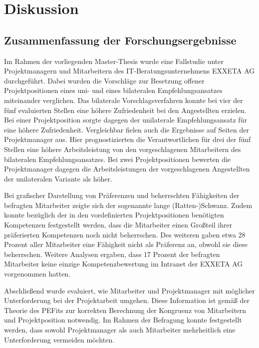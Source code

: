 \chapter{Diskussion}
\label{ch:diskussion}

\section{Zusammenfassung der Forschungsergebnisse}
\label{ch:diskussion:zusammenfassung}
Im Rahmen der vorliegenden Master-Thesis wurde eine Fallstudie unter Projektmanagern und Mitarbeitern des IT-Beratungsunternehmens EXXETA AG durchgeführt. Dabei wurden die Vorschläge zur Besetzung offener Projektpositionen eines uni- und eines bilateralen Empfehlungsansatzes miteinander verglichen. Das bilaterale Vorschlagsverfahren konnte bei vier der fünf evaluierten Stellen eine höhere Zufriedenheit bei den Angestellten erzielen. Bei einer Projektposition sorgte dagegen der unilaterale Empfehlungsansatz für eine höhere Zufriedenheit. Vergleichbar fielen auch die Ergebnisse auf Seiten der Projektmanager aus. Hier prognostizierten die Verantwortlichen für drei der fünf Stellen eine höhere Arbeitsleistung von den vorgeschlagenen Mitarbeitern des bilateralen Empfehlungsansatzes. Bei zwei Projektpositionen bewerten die Projektmanager dagegen die Arbeitsleistungen der vorgeschlagenen Angestellten der unilateralen Variante als höher.

Bei grafischer Darstellung von Präferenzen und beherrschten Fähigkeiten der befragten Mitarbeiter zeigte sich der sogenannte lange (Ratten-)Schwanz. Zudem konnte bezüglich der in den vordefinierten Projektpositionen benötigten Kompetenzen festgestellt werden, dass die Mitarbeiter einen Großteil ihrer präferierten Kompetenzen noch nicht beherrschen. Des weiteren gaben etwa 28 Prozent aller Mitarbeiter eine Fähigkeit nicht als Präferenz an, obwohl sie diese beherrschen. Weitere Analysen ergaben, dass 17 Prozent der befragten Mitarbeiter keine einzige Kompetenzbewertung im Intranet der EXXETA AG vorgenommen hatten.

Abschließend wurde evaluiert, wie Mitarbeiter und Projektmanager mit möglicher Unterforderung bei der Projektarbeit umgehen. Diese Information ist gemäß der Theorie des \acp{PEFit} zur korrekten Berechnung der Kongruenz von Mitarbeitern und Projektposition notwendig. Im Rahmen der Befragung konnte festgestellt werden, dass sowohl Projektmanager als auch Mitarbeiter mehrheitlich eine Unterforderung vermeiden möchten.

